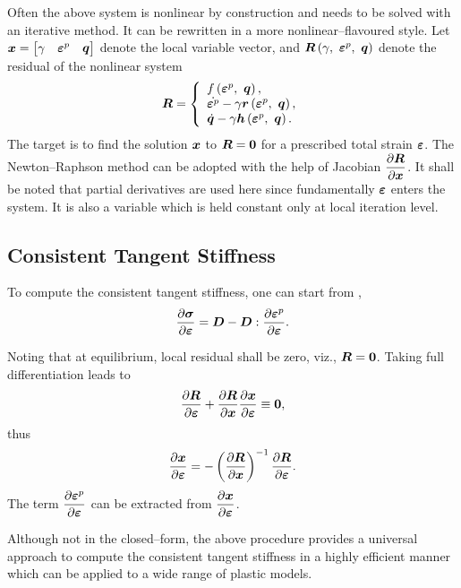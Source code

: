 Often the above system is nonlinear by construction and needs to be solved with an iterative method. It can be rewritten in a more nonlinear--flavoured style. Let $\bm{x}=\begin{bmatrix}
\gamma&\bm{\varepsilon}^p&\bm{q}
\end{bmatrix}$ denote the local variable vector, and $\bm{R}\left(\gamma,~\bm{\varepsilon}^p,~\bm{q}\right)$ denote the residual of the nonlinear system
\begin{gather}
\bm{R}=\left\{
\begin{array}{l}
f\left(\bm{\varepsilon}^p,~\bm{q}\right),\\
\dot{\bm{\varepsilon}^p}-\gamma\bm{r}\left(\bm{\varepsilon}^p,~\bm{q}\right),\\
\dot{\bm{q}}-\gamma\bm{h}\left(\bm{\varepsilon}^p,~\bm{q}\right).
\end{array}\right.
\end{gather}
The target is to find the solution $\bm{x}$ to $\bm{R}=\bm{0}$ for a prescribed total strain $\bm{\varepsilon}$. The Newton--Raphson method can be adopted with the help of Jacobian $\dfrac{\partial{\bm{R}}}{\partial{\bm{x}}}$. It shall be noted that partial derivatives are used here since fundamentally $\bm{\varepsilon}$ enters the system. It is also a variable which is held constant only at local iteration level.
\subsection{Consistent Tangent Stiffness}
To compute the consistent tangent stiffness, one can start from ,
\begin{gather}
\dfrac{\partial{\bm{\sigma}}}{\partial{\bm{\varepsilon}}}=\bm{D}-\bm{D}:\dfrac{\partial{\bm{\varepsilon}^p}}{\partial{\bm{\varepsilon}}}.
\end{gather}

Noting that at equilibrium, local residual shall be zero, viz., $\bm{R}=\bm{0}$. Taking full differentiation leads to
\begin{gather}\label{eq:consistent_stiffness}
\dfrac{\partial{\bm{R}}}{\partial{\bm{\varepsilon}}}+\dfrac{\partial{\bm{R}}}{\partial{\bm{x}}}\dfrac{\partial{\bm{x}}}{\partial{\bm{\varepsilon}}}\equiv\bm{0},
\end{gather}
thus
\begin{gather}
\dfrac{\partial{\bm{x}}}{\partial{\bm{\varepsilon}}}=-\left(\dfrac{\partial{\bm{R}}}{\partial{\bm{x}}}\right)^{-1}\dfrac{\partial{\bm{R}}}{\partial{\bm{\varepsilon}}}.
\end{gather}
The term $\dfrac{\partial{\bm{\varepsilon}^p}}{\partial{\bm{\varepsilon}}}$ can be extracted from $\dfrac{\partial{\bm{x}}}{\partial{\bm{\varepsilon}}}$.

Although not in the closed--form, the above procedure provides a universal approach to compute the consistent tangent stiffness in a highly efficient manner which can be applied to a wide range of plastic models.

